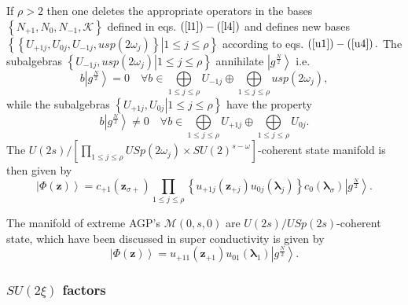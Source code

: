 \documentclass[aps,preprint]{revtex4}%
\begin{document}
If $\rho>2$ then one deletes the appropriate operators in the bases $\left\{
N_{+1},N_{0},N_{-1},\mathcal{K}\right\}  $ defined in eqs. $\left(
\ref{l1}\right)  -\left(  \ref{l4}\right)  $ and defines new bases $\left\{
\left.  \left\{  U_{+1j},U_{0j},U_{-1j},usp\left(  2\omega_{j}\right)
\right\}  \right\vert 1\leq j\leq\rho\right\}  $ according to eqs. $\left(
\ref{u1}\right)  -\left(  \ref{u4}\right)  .$ The subalgebras $\left\{
\left.  U_{-1j},usp\left(  2\omega_{j}\right)  \right\vert 1\leq j\leq
\rho\right\}  $ annihilate $\left\vert g^{\frac{N}{2}}\right\rangle $ i.e.
\begin{equation}
b\left\vert g^{\frac{N}{2}}\right\rangle =0\quad\forall b\in\bigoplus
\limits_{1\leq j\leq\rho}U_{-1j}\oplus\bigoplus\limits_{1\leq j\leq\rho
}usp\left(  2\omega_{j}\right)  ,
\end{equation}
while the subalgebras $\left\{  \left.  U_{+1j},U_{0j}\right\vert 1\leq
j\leq\rho\right\}  $ have the property
\begin{equation}
b\left\vert g^{\frac{N}{2}}\right\rangle \neq0\quad\forall b\in\bigoplus
\limits_{1\leq j\leq\rho}U_{+1j}\oplus\bigoplus\limits_{1\leq j\leq\rho}%
U_{0j}.
\end{equation}
The $U\left(  2s\right)  /\left[
{\textstyle\prod_{1\leq j\leq\rho}}
USp\left(  2\omega_{j}\right)  \times SU\left(  2\right)  ^{s-\omega}\right]
$-coherent state manifold is then given by
\begin{equation}
\left\vert \Phi\left(  \mathbf{z}\right)  \right\rangle =c_{+1}\left(
\mathbf{z}_{\sigma+}\right)
{\textstyle\prod_{1\leq j\leq\rho}}
\left\{  u_{+1j}\left(  \mathbf{z}_{+j}\right)  u_{0j}\left(  \mathbf{\lambda
}_{j}\right)  \right\}  c_{0}\left(  \mathbf{\lambda}_{\sigma}\right)
\left\vert g^{\frac{N}{2}}\right\rangle .
\end{equation}


The manifold of extreme AGP's $\mathcal{M}\left(  0,s,0\right)  $ are
$U\left(  2s\right)  /USp\left(  2s\right)  $-coherent state, which have been
discussed in super conductivity \cite{Colemansuper} is given by
\begin{equation}
\left\vert \Phi\left(  \mathbf{z}\right)  \right\rangle =u_{+11}\left(
\mathbf{z}_{+1}\right)  u_{01}\left(  \mathbf{\lambda}_{1}\right)  \left\vert
g^{\frac{N}{2}}\right\rangle .
\end{equation}


\subsubsection{$SU\left(  2\xi\right)  $ factors}
\end{document}
